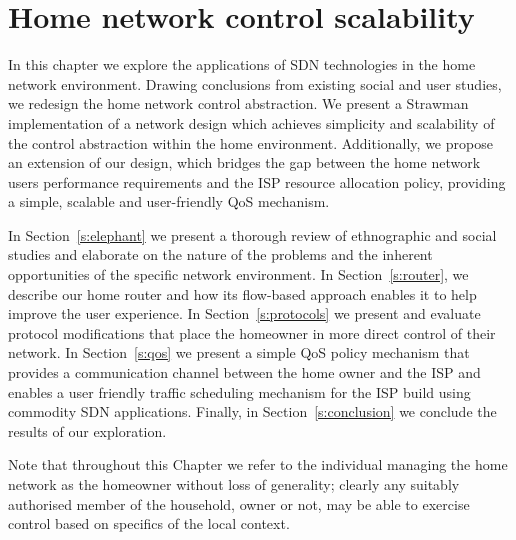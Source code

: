 \chapter{Home network control scalability} 

\ifpdf
\graphicspath{{Chapter2/Chapter2Figs/PNG/}{Chapter2/Chapter2Figs/PDF/}{Chapter2/Chapter2Figs/}}
\else 
\graphicspath{{Chapter2/Chapter2Figs/EPS/}{Chapter2/Chapter2Figs/}} 
\fi

In this chapter we explore the applications of SDN technologies in the home
network environment. Drawing conclusions from existing social and user studies,
we redesign the home network control abstraction. We present a Strawman
implementation of a network design which achieves simplicity and scalability of
the control abstraction within the home environment. Additionally, we propose an
extension of our design, which bridges the gap between the home network users
performance requirements and the ISP resource allocation policy, providing a
simple, scalable and user-friendly QoS mechanism.

In Section~\ref{s:elephant} we present a thorough review of ethnographic and
social studies and elaborate on the nature of the problems and the inherent
opportunities of the specific network environment. In Section~\ref{s:router}, we
describe our home router and how its flow-based approach enables it to help
improve the user experience. In Section~\ref{s:protocols} we present and evaluate
protocol modifications that place the homeowner in more direct control of their
network. In Section~\ref{s:qos} we present a simple QoS policy mechanism that
provides a communication channel between the home owner and the ISP and enables
a user friendly traffic scheduling mechanism for the ISP build using commodity
SDN applications. Finally, in Section~\ref{s:conclusion} we conclude the results of
our exploration.

Note that throughout this Chapter we refer to the individual managing the home
network as the homeowner without loss of generality; clearly any suitably
authorised member of the household, owner or not, may be able to exercise control
based on specifics of the local context. 


